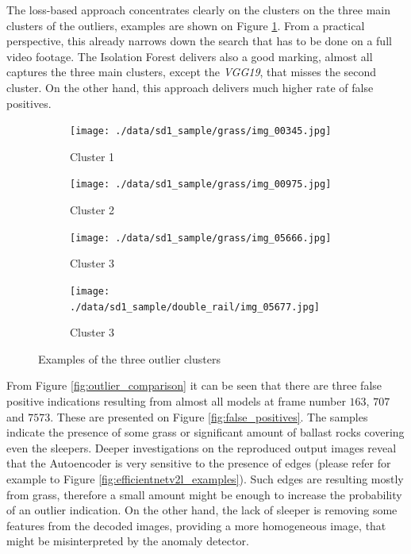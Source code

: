 The loss-based approach concentrates clearly on the clusters on the three main clusters of the
outliers, examples are shown on Figure \ref{fig:outlier_cluster_exampels}.
From a practical perspective, this already narrows down the search that has to be done on a full
video footage.
The Isolation Forest delivers also a good marking, almost all captures the three main clusters,
except the \emph{VGG19}, that misses the second cluster.
On the other hand, this approach delivers much higher rate of false positives.

\begin{figure}[H]
    \centering
    \begin{subfigure}{0.48\textwidth}
        \centering
        \texttt{[image: ./data/sd1\_sample/grass/img\_00345.jpg]}
        \caption*{Cluster 1}
    \end{subfigure}
    \begin{subfigure}{0.48\textwidth}
        \centering
        \texttt{[image: ./data/sd1\_sample/grass/img\_00975.jpg]}
        \caption*{Cluster 2}
    \end{subfigure}
    \begin{subfigure}{0.48\textwidth}
        \centering
        \texttt{[image: ./data/sd1\_sample/grass/img\_05666.jpg]}
        \caption*{Cluster 3}
    \end{subfigure}
    \begin{subfigure}{0.48\textwidth}
        \centering
        \texttt{[image: ./data/sd1\_sample/double\_rail/img\_05677.jpg]}
        \caption*{Cluster 3}
    \end{subfigure}
    \caption{Examples of the three outlier clusters}
    \label{fig:outlier_cluster_exampels}
\end{figure}

From Figure \ref{fig:outlier_comparison} it can be seen that there are three false positive
indications resulting from almost all models at frame number $163$, $707$ and $7573$.
These are presented on Figure \ref{fig:false_positives}.
The samples indicate the presence of some grass or significant amount of ballast rocks
covering even the sleepers.
Deeper investigations on the reproduced output images reveal that the Autoencoder is
very sensitive to the presence of edges (please refer for example to Figure
\ref{fig:efficientnetv2l_examples}).
Such edges are resulting mostly from grass, therefore a small amount might be enough
to increase the probability of an outlier indication.
On the other hand, the lack of sleeper is removing some features from the decoded images,
providing a more homogeneous image, that might be misinterpreted by the anomaly detector.

